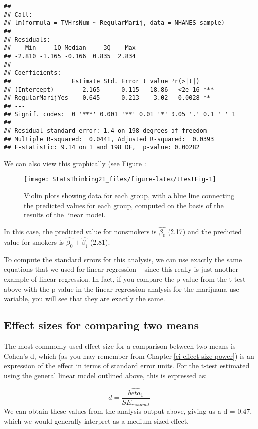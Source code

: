 \documentclass[]{book}
\theoremstyle{definition}
\theoremstyle{definition}
\theoremstyle{definition}
\theoremstyle{remark}
\begin{document}
\begin{verbatim}
## 
## Call:
## lm(formula = TVHrsNum ~ RegularMarij, data = NHANES_sample)
## 
## Residuals:
##    Min     1Q Median     3Q    Max 
## -2.810 -1.165 -0.166  0.835  2.834 
## 
## Coefficients:
##                 Estimate Std. Error t value Pr(>|t|)    
## (Intercept)        2.165      0.115   18.86   <2e-16 ***
## RegularMarijYes    0.645      0.213    3.02   0.0028 ** 
## ---
## Signif. codes:  0 '***' 0.001 '**' 0.01 '*' 0.05 '.' 0.1 ' ' 1
## 
## Residual standard error: 1.4 on 198 degrees of freedom
## Multiple R-squared:  0.0441, Adjusted R-squared:  0.0393 
## F-statistic: 9.14 on 1 and 198 DF,  p-value: 0.00282
\end{verbatim}

We can also view this graphically (see Figure :

\begin{figure}
\texttt{[image: StatsThinking21\_files/figure-latex/ttestFig-1]} \caption{Violin plots showing data for each group, with a blue line connecting the predicted values for each group, computed on the basis of the results of the linear model.}\label{fig:ttestFig}
\end{figure}

In this case, the predicted value for nonsmokers is \(\hat{\beta_0}\)
(2.17) and the predicted value for smokers is
\(\hat{\beta_0} +\hat{\beta_1}\) (2.81).

To compute the standard errors for this analysis, we can use exactly the
same equations that we used for linear regression -- since this really
is just another example of linear regression. In fact, if you compare
the p-value from the t-test above with the p-value in the linear
regression analysis for the marijuana use variable, you will see that
they are exactly the same.

\subsection{Effect sizes for comparing two
means}\label{effect-sizes-for-comparing-two-means}

The most commonly used effect size for a comparison between two means is
Cohen's d, which (as you may remember from Chapter
\ref{ci-effect-size-power}) is an expression of the effect in terms of
standard error units. For the t-test estimated using the general linear
model outlined above, this is expressed as:

\[
d = \frac{\hat{beta_1}}{SE_{residual}}
\] We can obtain these values from the analysis output above, giving us
a d = 0.47, which we would generally interpret as a medium sized effect.
\end{document}
